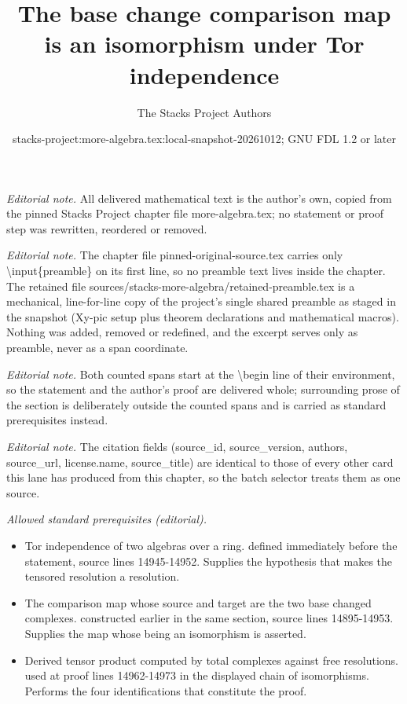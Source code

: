 \documentclass[10pt,a4paper]{amsart}
\title{The base change comparison map is an isomorphism under Tor independence}
\author{The Stacks Project Authors}
\date{stacks-project:more-algebra.tex:local-snapshot-20261012; GNU FDL 1.2 or later}
\theoremstyle{plain}
\theoremstyle{definition}
\theoremstyle{remark}
\numberwithin{equation}{subsection}
\begin{document}
\maketitle
\setcounter{subsection}{1}
\noindent\textit{Editorial note.} All delivered mathematical text is the author's own, copied from the pinned Stacks Project chapter file more-algebra.tex; no statement or proof step was rewritten, reordered or removed.\par\medskip
\noindent\textit{Editorial note.} The chapter file pinned-original-source.tex carries only \textbackslash{}input\{preamble\} on its first line, so no preamble text lives inside the chapter. The retained file sources/stacks-more-algebra/retained-preamble.tex is a mechanical, line-for-line copy of the project's single shared preamble as staged in the snapshot (Xy-pic setup plus theorem declarations and mathematical macros). Nothing was added, removed or redefined, and the excerpt serves only as preamble, never as a span coordinate.\par\medskip
\noindent\textit{Editorial note.} Both counted spans start at the \textbackslash{}begin line of their environment, so the statement and the author's proof are delivered whole; surrounding prose of the section is deliberately outside the counted spans and is carried as standard prerequisites instead.\par\medskip
\noindent\textit{Editorial note.} The citation fields (source\_id, source\_version, authors, source\_url, license.name, source\_title) are identical to those of every other card this lane has produced from this chapter, so the batch selector treats them as one source.\par\medskip
\noindent\textit{Allowed standard prerequisites (editorial).}\begin{itemize}
\item Tor independence of two algebras over a ring. defined immediately before the statement, source lines 14945-14952. Supplies the hypothesis that makes the tensored resolution a resolution.
\item The comparison map whose source and target are the two base changed complexes. constructed earlier in the same section, source lines 14895-14953. Supplies the map whose being an isomorphism is asserted.
\item Derived tensor product computed by total complexes against free resolutions. used at proof lines 14962-14973 in the displayed chain of isomorphisms. Performs the four identifications that constitute the proof.
\end{itemize}\medskip
\end{document}

